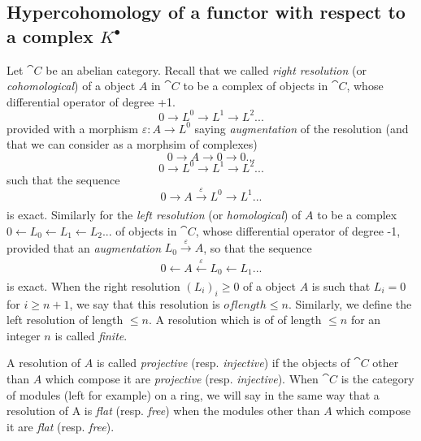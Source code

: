 \subsection{Hypercohomology of a functor with respect to a complex $K^{\bullet}$}
\label{subsection:0.11.4}

\begin{env}[11.4.1]
\label{0.11.4.1}
Let $\cat{C}$ be an abelian category.
Recall that we called \emph{right resolution} (or \emph{cohomological}) of a object $A$ in $\cat{C}$ to be
a complex of objects in $\cat{C}$, whose differential operator of degree +1.
\[
  0 \rightarrow L^0 \rightarrow L^1 \rightarrow L^2 ...
\]
provided with a morphism $\varepsilon: A \rightarrow L^0$ saying \emph{augmentation} of the resolution (and that we can consider as a morphsim of complexes)
\[
  0 \rightarrow A \rightarrow 0 \rightarrow 0 ...
\]
\[
  0 \rightarrow L^0 \rightarrow L^1 \rightarrow L^2 ...
\]
such that the sequence
\[
  0 \rightarrow A \xrightarrow[]{\varepsilon} L^0 \rightarrow L^1 ...
\]
is exact.
Similarly for the \emph{left resolution} (or \emph{homological}) of $A$ to be a complex $0 \leftarrow L_0 \leftarrow L_1 \leftarrow L_2 ...$
of objects in $\cat{C}$, whose differential operator of degree -1, provided that an \emph{augmentation} $L_0 \xrightarrow[]{\varepsilon} A$, so that the sequence
\[
  0 \leftarrow A \xleftarrow[]{\varepsilon} L_0 \leftarrow L_1 ...
\]
is exact.
When the right resolution $(L_i)_i\geq 0$ of a object $A$ is such that $L_i=0$ for $i\geq n+1$, we say that this resolution is $of length \leq n$.
Similarly, we define the left resolution of length $\leq n$.
A resolution which is of of length $\leq n$ for an integer $n$ is called \emph{finite}.

A resolution of $A$ is called \emph{projective} (resp. \emph{injective}) if the objects of $\cat{C}$ other than $A$ which compose it are \emph{projective} (resp. \emph{injective}). 
When $\cat{C}$ is the category of modules (left for example) on a ring, 
we will say in the same way that a resolution of A is \emph{flat} (resp. \emph{free}) when the modules other than $A$ which compose it are \emph{flat} (resp. \emph{free}).
\end{env}


